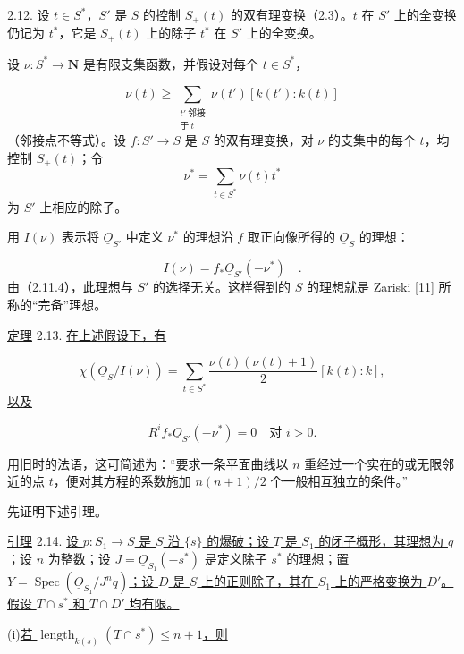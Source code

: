 2.12. 设 $t\in S^*$，$S'$ 是 $S$ 的控制 $S_+(t)$ 的双有理变换（2.3）。$t$ 在 $S'$ 上的\underline{全变换}仍记为 $t^*$，它是 $S_+(t)$ 上的除子 $t^*$ 在 $S'$ 上的全变换。

设 $\nu:S^*\longrightarrow\mathbf N$ 是有限支集函数，并假设对每个 $t\in S^*$，

\begin{equation}\tag{2.12.1}
\nu(t)\geq
\sum_{\substack{t'\ \text{邻接}\\\text{于}\ t}}
\nu(t')[k(t'):k(t)]
\end{equation}
（邻接点不等式）。设 $f:S'\longrightarrow S$ 是 $S$ 的双有理变换，对 $\nu$ 的支集中的每个 $t$，均控制 $S_+(t)$；令
\[
\nu^*=\sum_{t\in S^*}\nu(t)t^*
\]
为 $S'$ 上相应的除子。


用 $I(\nu)$ 表示将 $\underline{O}_{S'}$ 中定义 $\nu^*$ 的理想沿 $f$ 取正向像所得的 $\underline{O}_S$ 的理想：

\begin{equation*}
I(\nu)=f_*\underline{O}_{S'}(-\nu^*) \quad .
\end{equation*}
由（2.11.4），此理想与 $S'$ 的选择无关。这样得到的 $S$ 的理想就是 Zariski [11] 所称的“完备”理想。

\underline{定理} 2.13. \underline{在上述假设下，有}

\begin{equation*}
\chi(\underline{O}_S/I(\nu))
=\sum_{t\in S^*}\frac{\nu(t)(\nu(t)+1)}2[k(t):k],
\end{equation*}
\underline{以及}

\begin{equation*}
R^if_*\underline{O}_{S'}(-\nu^*)=0
\quad\text{对 }i>0.
\end{equation*}

用旧时的法语，这可简述为：“要求一条平面曲线以 $n$ 重经过一个实在的或无限邻近的点 $t$，便对其方程的系数施加 $n(n+1)/2$ 个一般相互独立的条件。”

先证明下述引理。

\underline{引理} 2.14. \underline{设 $p:S_1\longrightarrow S$ 是 $S$ 沿 $\{s\}$ 的爆破；设 $T$ 是 $S_1$ 的闭子概形，其理想为 $q$；设 $n$ 为整数；设 $J=\underline{O}_{S_1}(-s^*)$ 是定义除子 $s^*$ 的理想；置 $Y=\operatorname{Spec}(\underline{O}_{S_1}/J^nq)$；设 $D$ 是 $S$ 上的正则除子，其在 $S_1$ 上的严格变换为 $D'$。假设 $T\cap s^*$ 和 $T\cap D'$ 均有限。}

(i)\quad \underline{若 $\operatorname{length}_{k(s)}(T\cap s^*)\leq n+1$，则}

